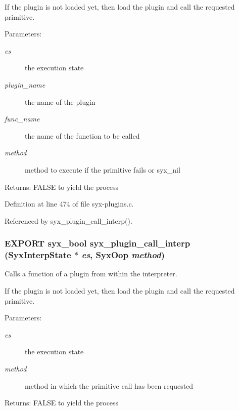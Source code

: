 If the plugin is not loaded yet, then load the plugin and call the requested primitive.

\begin{Desc}
\item[Parameters:]
\begin{description}
\item[{\em es}]the execution state \item[{\em plugin\_\-name}]the name of the plugin \item[{\em func\_\-name}]the name of the function to be called \item[{\em method}]method to execute if the primitive fails or syx\_\-nil \end{description}
\end{Desc}
\begin{Desc}
\item[Returns:]FALSE to yield the process \end{Desc}


Definition at line 474 of file syx-plugins.c.

Referenced by syx\_\-plugin\_\-call\_\-interp().\hypertarget{syx-plugins_8h_24a2010c317aa2f5bf36c97fce248e86}{
\subsubsection{\setlength{\rightskip}{0pt plus 5cm}EXPORT {\bf syx\_\-bool} syx\_\-plugin\_\-call\_\-interp ({\bf SyxInterpState} $\ast$ {\em es}, \/  {\bf SyxOop} {\em method})}}
\label{syx-plugins_8h_24a2010c317aa2f5bf36c97fce248e86}


Calls a function of a plugin from within the interpreter.

If the plugin is not loaded yet, then load the plugin and call the requested primitive.

\begin{Desc}
\item[Parameters:]
\begin{description}
\item[{\em es}]the execution state \item[{\em method}]method in which the primitive call has been requested \end{description}
\end{Desc}
\begin{Desc}
\item[Returns:]FALSE to yield the process \end{Desc}


